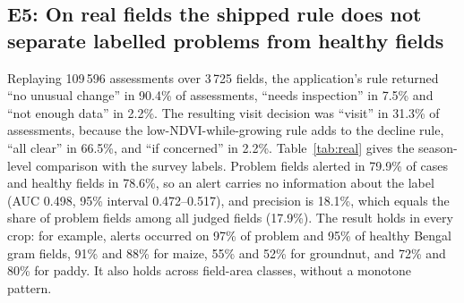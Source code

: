 \documentclass[conference]{IEEEtran}
\begin{document}
\subsection{E5: On real fields the shipped rule does not separate labelled problems from healthy fields}
Replaying 109\,596 assessments over 3\,725 fields, the application's rule returned ``no unusual change'' in 90.4\% of assessments, ``needs inspection'' in 7.5\% and ``not enough data'' in 2.2\%. The resulting visit decision was ``visit'' in 31.3\% of assessments, because the low-NDVI-while-growing rule adds to the decline rule, ``all clear'' in 66.5\%, and ``if concerned'' in 2.2\%. Table~\ref{tab:real} gives the season-level comparison with the survey labels. Problem fields alerted in 79.9\% of cases and healthy fields in 78.6\%, so an alert carries no information about the label (AUC 0.498, 95\% interval 0.472--0.517), and precision is 18.1\%, which equals the share of problem fields among all judged fields (17.9\%). The result holds in every crop: for example, alerts occurred on 97\% of problem and 95\% of healthy Bengal gram fields, 91\% and 88\% for maize, 55\% and 52\% for groundnut, and 72\% and 80\% for paddy. It also holds across field-area classes, without a monotone pattern.

\begin{table}[t]
\caption{E5: Season-level replay of the shipped rule on 3\,725 real fields (Wilson 95\% intervals)}
\label{tab:real}
\centering
{}
\end{table}
\end{document}
